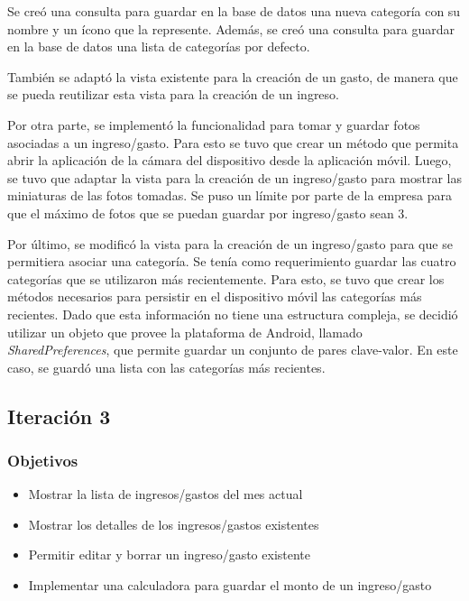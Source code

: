 Se creó una consulta para guardar en la base de datos una nueva categoría con su nombre y un ícono que la represente. Además, se creó una consulta para guardar en la base de datos una lista de categorías por defecto.

También se adaptó la vista existente para la creación de un gasto, de manera que se pueda reutilizar esta vista para la creación de un ingreso. 

Por otra parte, se implementó la funcionalidad para tomar y guardar fotos asociadas a un ingreso/gasto. Para esto se tuvo que crear un método que permita abrir la aplicación de la cámara del dispositivo desde la aplicación móvil. Luego, se tuvo que adaptar la vista para la creación de un ingreso/gasto para mostrar las miniaturas de las fotos tomadas. Se puso un límite por parte de la empresa para que el máximo de fotos que se puedan guardar por ingreso/gasto sean 3.

Por último, se modificó la vista para la creación de un ingreso/gasto para que se permitiera asociar una categoría. Se tenía como requerimiento guardar las cuatro categorías que se utilizaron más recientemente. Para esto, se tuvo que crear los métodos necesarios para persistir en el dispositivo móvil las categorías más recientes. Dado que esta información no tiene una estructura compleja, se decidió utilizar un objeto que provee la plataforma de Android, llamado \textit{SharedPreferences}, que permite guardar un conjunto de pares clave-valor. En este caso, se guardó una lista con las categorías más recientes.

\subsection{Iteración 3}
\subsubsection{Objetivos}
\begin{itemize}
\item Mostrar la lista de ingresos/gastos del mes actual
\item Mostrar los detalles de los ingresos/gastos existentes
\item Permitir editar y borrar un ingreso/gasto existente
\item Implementar una calculadora para guardar el monto de un ingreso/gasto
\end{itemize}

